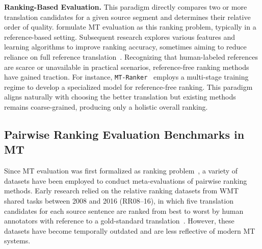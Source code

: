 \documentclass{article}
\theoremstyle{plain}
\theoremstyle{definition}
\theoremstyle{remark}
\newcommand{\rankerx}{\texttt{MT-Ranker}}
\begin{document}
\noindent
\textbf{Ranking-Based Evaluation.}
This paradigm directly compares two or more translation candidates for a given source segment and determines their relative order of quality. 
\citet{ye2007sentence} formulate MT evaluation as this ranking problem, typically in a reference-based setting.  Subsequent research explores various features and learning algorithms to improve ranking accuracy, sometimes aiming to reduce reliance on full reference translation~\citep{Duh2008RankingVR,Guzmn2014LearningTD,Guzmn2015PairwiseNM,Song2011RegressionAR,Zhang2020TranslationQE}.
Recognizing that human-labeled references are scarce or unavailable in practical scenarios, reference-free ranking methods have gained traction. For instance, \rankerx~\citep{MT-RANKER} employs a multi-stage training regime to develop a specialized model for reference-free ranking. This paradigm aligns naturally with choosing the better translation but existing methods remains coarse-grained, producing only a holistic overall ranking.

\subsection{Pairwise Ranking Evaluation Benchmarks in MT}\label{sec:benchmark}

Since MT evaluation was first formalized as ranking problem~\citep{ye2007sentence}, a variety of datasets have been employed to conduct meta-evaluations of pairwise ranking methods. Early research relied on the relative ranking datasets from WMT shared tasks between 2008 and 2016 (RR08–16), in which five translation candidates for each source sentence are ranked from best to worst by human annotators with reference to a gold-standard translation~\citep{CallisonBurch2008FurtherMO}. However, these datasets have become temporally outdated and are less reflective of modern MT systems.
\end{document}
